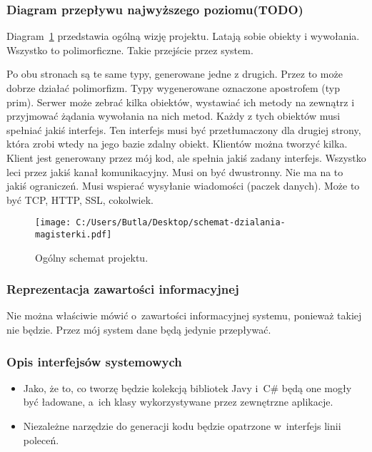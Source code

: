 \subsubsection{Diagram przepływu najwyższego poziomu(TODO)}
Diagram~\ref{fig:project-overview} przedstawia ogólną wizję projektu.
Latają sobie obiekty i wywołania. Wszystko to polimorficzne.
Takie przejście przez system.

Po obu stronach są te same typy, generowane jedne z drugich. Przez to może dobrze działać polimorfizm. Typy wygenerowane oznaczone apostrofem (typ prim).
Serwer może zebrać kilka obiektów, wystawiać ich metody na zewnątrz i przyjmować żądania wywołania na nich metod.
Każdy z tych obiektów musi spełniać jakiś interfejs. Ten interfejs musi być przetłumaczony dla drugiej strony, która zrobi wtedy na jego bazie zdalny obiekt.
Klientów można tworzyć kilka. Klient jest generowany przez mój kod, ale spełnia jakiś zadany interfejs.
Wszystko leci przez jakiś kanał komunikacyjny. Musi on być dwustronny. Nie ma na to jakiś ograniczeń. Musi wspierać wysyłanie wiadomości (paczek danych). Może to być TCP, HTTP, SSL, cokolwiek.

\begin{figure}
	\centering
		\texttt{[image: C:/Users/Butla/Desktop/schemat-dzialania-magisterki.pdf]}
	\caption{Ogólny schemat projektu.}
	\label{fig:project-overview}
\end{figure}


\subsubsection{Reprezentacja zawartości informacyjnej}
Nie można właściwie mówić o~zawartości informacyjnej systemu, ponieważ takiej nie będzie.
Przez mój system dane będą jedynie przepływać.


\subsubsection{Opis interfejsów systemowych}
\begin{itemize}
	\item Jako, że to, co tworzę będzie kolekcją bibliotek Javy i~C\# będą one mogły być ładowane, a~ich klasy wykorzystywane przez zewnętrzne aplikacje.
	\item Niezależne narzędzie do generacji kodu będzie opatrzone w~interfejs linii poleceń.
\end{itemize}


